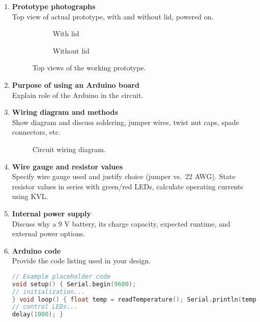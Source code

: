 \documentclass[10pt]{article}
\begin{document}
\begin{enumerate}
	\item \textbf{Prototype photographs}\\ Top view of actual prototype, with and
	      without lid, powered on.  \begin{figure}[H] \centering
		      \begin{subfigure}[b]{0.45\textwidth}
			      \caption{With lid} \end{subfigure} \hfill \begin{subfigure}[b]{0.45\textwidth}
			      \caption{Without lid} \end{subfigure} \caption{Top views of the working
			      prototype.} \end{figure}

	\item \textbf{Purpose of using an Arduino board}\\ Explain role of the Arduino
	      in the circuit.

	\item \textbf{Wiring diagram and methods}\\ Show diagram and discuss soldering,
	      jumper wires, twist nut caps, spade connectors, etc.  \begin{figure}[H]
		      \centering
		      \caption{Circuit wiring diagram.} \end{figure}

	\item \textbf{Wire gauge and resistor values}\\ Specify wire gauge used and
	      justify choice (jumper vs.\ 22 AWG).  State resistor values in series with
	      green/red LEDs, calculate operating currents using KVL.

	\item \textbf{Internal power supply}\\ Discuss why a 9 V battery, its charge
	      capacity, expected runtime, and external power options.

	\item \textbf{Arduino code}\\ Provide the code listing used in your design.
	      \begin{lstlisting}[language=C, caption={Arduino sketch for temperature
monitoring}]
// Example placeholder code
void setup() { Serial.begin(9600);
// initialization...
} void loop() { float temp = readTemperature(); Serial.println(temp);
// control LEDs...
delay(1000); } \end{lstlisting}



\end{enumerate}
\end{document}
